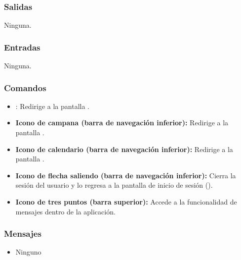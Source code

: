 \subsubsection{Salidas}
Ninguna.

\subsubsection{Entradas}
Ninguna.

\subsubsection{Comandos}
\begin{itemize}
	\item {}: Redirige a la pantalla .
	\item \textbf{Icono de campana (barra de navegación inferior):} Redirige a la pantalla .
	\item \textbf{Icono de calendario (barra de navegación inferior):} Redirige a la pantalla .
	\item \textbf{Icono de flecha saliendo (barra de navegación inferior):} Cierra la sesión del usuario y lo regresa a la pantalla de inicio de sesión ().
	\item \textbf{Icono de tres puntos (barra superior):} Accede a la funcionalidad de mensajes dentro de la aplicación.
\end{itemize}

\subsubsection{Mensajes}
\begin{itemize}
	\item Ninguno
\end{itemize}

